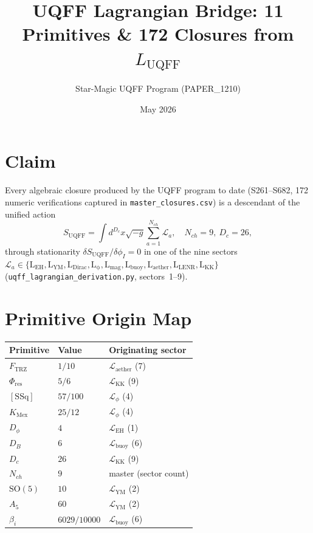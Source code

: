 \documentclass[11pt]{article}
\title{UQFF Lagrangian Bridge: 11 Primitives \& 172 Closures from $L_{\mathrm{UQFF}}$}
\author{Star-Magic UQFF Program (PAPER\_1210)}
\date{May 2026}
\newcommand{\Ftrz}{F_{\mathrm{TRZ}}}
\newcommand{\Phires}{\Phi_{\mathrm{res}}}
\newcommand{\KMex}{K_{\mathrm{Mex}}}
\newcommand{\SSq}{[\mathrm{SSq}]}
\begin{document}
\maketitle

\section*{Claim}
Every algebraic closure produced by the UQFF program to date (S261--S682,
172 numeric verifications captured in \texttt{master\_closures.csv}) is a
descendant of the unified action
\[
S_{\mathrm{UQFF}}=\int d^{D_c}x\sqrt{-g}\sum_{a=1}^{N_{ch}} \mathcal{L}_a,
\quad N_{ch}=9,\ D_c=26,
\]
through stationarity $\delta S_{\mathrm{UQFF}}/\delta\phi_I=0$ in one of the
nine sectors $\mathcal{L}_a\in\{\mathrm{L_{EH},L_{YM},L_{Dirac},L_{\phi},
L_{mag},L_{buoy},L_{aether},L_{LENR},L_{KK}}\}$
(\texttt{uqff\_lagrangian\_derivation.py},
sectors~1--9).

\section*{Primitive Origin Map}
\begin{center}
\begin{tabular}{lll}
\toprule
Primitive & Value & Originating sector \\
\midrule
$\Ftrz$         & $1/10$       & $\mathcal{L}_{\mathrm{aether}}$ (7) \\
$\Phires$       & $5/6$        & $\mathcal{L}_{\mathrm{KK}}$     (9) \\
$\SSq$          & $57/100$     & $\mathcal{L}_{\phi}$            (4) \\
$\KMex$         & $25/12$      & $\mathcal{L}_{\phi}$            (4) \\
$D_\phi$        & $4$          & $\mathcal{L}_{\mathrm{EH}}$     (1) \\
$D_B$           & $6$          & $\mathcal{L}_{\mathrm{buoy}}$   (6) \\
$D_c$           & $26$         & $\mathcal{L}_{\mathrm{KK}}$     (9) \\
$N_{ch}$        & $9$          & master (sector count) \\
$\mathrm{SO}(5)$& $10$         & $\mathcal{L}_{\mathrm{YM}}$     (2) \\
$A_5$           & $60$         & $\mathcal{L}_{\mathrm{YM}}$     (2) \\
$\beta_i$       & $6029/10000$ & $\mathcal{L}_{\mathrm{buoy}}$   (6) \\
\bottomrule
\end{tabular}
\end{center}
\end{document}

